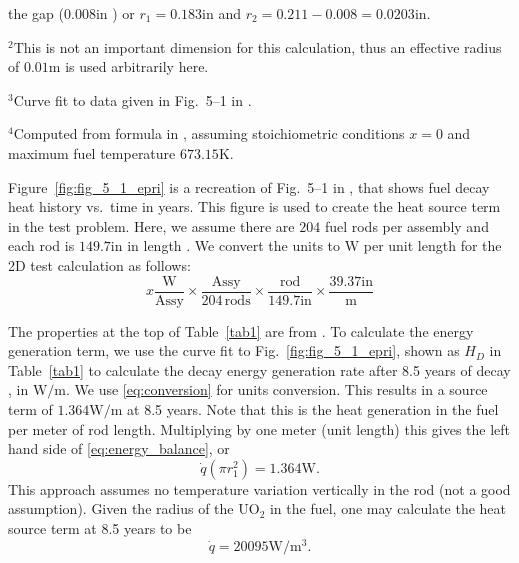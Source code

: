 \documentclass[12pt]{article}
\newcommand{\uo}{\mathrm{UO}_2}
\newcommand{\K}{\ensuremath{\mbox{K}}}
\newcommand{\W}{\ensuremath{\mbox{W}}}
\newcommand{\m}{\ensuremath{\mbox{m}}}
\newcommand{\inch}{\ensuremath{\mbox{in}}}
\begin{document}
\begin{table}[!htbp]
\begin{minipage}{5.5in}
the gap ($0.008\inch$ \cite{roberts75}) or $r_1 = 0.183\inch$ and $r_2 = 0.211 - 0.008 = 0.0203\inch$.
\end{minipage}
\begin{minipage}{5.5in}
\hspace{-5pt}\mbox{}$^2$This is not an important dimension for this calculation, thus an effective radius
of $0.01\m$ is used arbitrarily here.
\end{minipage}
\begin{minipage}{5.5in}
\hspace{-5pt}\mbox{}$^3$Curve fit to data given in Fig.~5--1 in \cite{EPRI1003135}.
\end{minipage}
\begin{minipage}{5.5in}
\hspace{-5pt}\mbox{}$^4$Computed from formula in \cite{ramirez.ea06}, assuming stoichiometric conditions $x = 0$ and
maximum fuel temperature $673.15\K$.
\end{minipage}

\end{table}

Figure~\ref{fig:fig_5_1_epri} is a recreation of Fig.~5--1 in \cite{EPRI1003135}, that shows fuel decay heat history
vs.\ time in years. This figure is used to create the heat source term in the test problem. Here, we assume there are
$204$ fuel rods per assembly and each rod is $149.7\inch$ in length \cite{roberts75}. We convert the units
to $\W$ per unit length for the 2D test calculation as follows:
%
\begin{equation}
x \frac{\W}{\mathrm{Assy}} \times \frac{\mathrm{Assy}}{204 \, \mathrm{rods}} \times \frac{\mathrm{rod}}{149.7\inch} \times \frac{39.37\inch}{\m}
\label{eq:conversion}
\end{equation}

The properties at the top of Table~\ref{tab1} are from \cite{thermooxy08}. To calculate the energy generation
term, we use the curve fit to Fig.~\ref{fig:fig_5_1_epri}, shown as $H_D$ in
Table~\ref{tab1} to calculate the decay energy generation rate after 8.5 years of
decay \cite{EPRI1003135}, in $\W / \m$. We use \eqref{eq:conversion} for units conversion. This
results in a source term of $1.364\W / \m$ at 8.5 years.  Note that this is the
heat generation in the fuel per meter of rod length. Multiplying by one meter (unit length) this gives the left hand
side of \eqref{eq:energy_balance}, or
%
\begin{equation}
\dot{q}(\pi r^2_1) = 1.364 \W.
\end{equation}
%
This approach assumes no temperature variation vertically in the rod (not a good assumption). Given the radius
of the $\uo$ in the fuel, one may calculate the heat source term at 8.5 years to be 
%
\begin{equation}
\dot{q} = 20095 \W / \m^3.
\end{equation}




\end{document}

